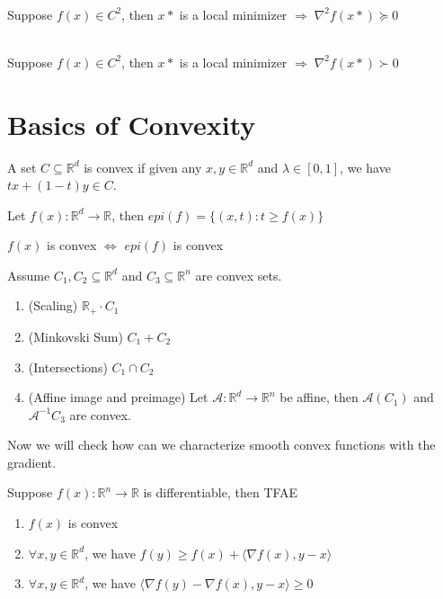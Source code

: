\begin{theorem}~\\
    \indent Suppose $f(x) \in C^2$, then $x*$ is a local minimizer $\Rightarrow \; \nabla^2 f(x*) \succeq 0$ 
\end{theorem}

\begin{theorem}~\\
    \indent Suppose $f(x) \in C^2$, then $x*$ is a local minimizer $\Rightarrow \; \nabla^2 f(x*) \succ 0$
\end{theorem}


\section{Basics of Convexity}
\begin{definition}
    A set $C \subseteq \mathbb{R}^d$ is convex if given any $x,y \in \mathbb{R}^d$ and $\lambda \in [0,1]$, we have $tx + (1-t)y \in C$.
\end{definition}
\begin{definition}[Epigraph]
    Let $f(x): \mathbb{R}^d \rightarrow \mathbb{R}$, then $epi(f) = \{(x, t) : t \geq f(x)\}$
\end{definition}
\begin{lemma}
    $f(x)$ is convex $\Leftrightarrow$ $epi(f)$ is convex
\end{lemma}

\begin{lemma}
    Assume $C_1, C_2 \subseteq \mathbb{R}^d$ and $C_3 \subseteq \mathbb{R}^n$ are convex sets.
    \begin{enumerate}
        \item (Scaling) $\mathbb{R}_+ \cdot C_1$
        \item (Minkovski Sum) $C_1 + C_2$
        \item (Intersections) $C_1 \cap C_2$
        \item (Affine image and preimage) Let $\mathcal{A}:\mathbb{R}^d \rightarrow \mathbb{R}^n$ be affine, then $\mathcal{A}(C_1)$ and $\mathcal{A}^{-1}C_3$ are convex.
    \end{enumerate}
\end{lemma}

Now we will check how can we characterize smooth convex functions with the gradient.

\begin{proposition}\label{prop:FirstOrderConvexCharacterization}
    Suppose $f(x): \mathbb{R}^n \rightarrow \mathbb{R}$ is differentiable, then TFAE
    \begin{enumerate}
        \item $f(x)$ is convex
        \item $\forall x,y \in \mathbb{R}^d$, we have $f(y) \geq f(x) + \langle \nabla f(x), y-x \rangle$
        \item $\forall x,y \in \mathbb{R}^d$, we have $\langle \nabla f(y) - \nabla f(x), y-x \rangle \geq 0$
    \end{enumerate}
\end{proposition}

